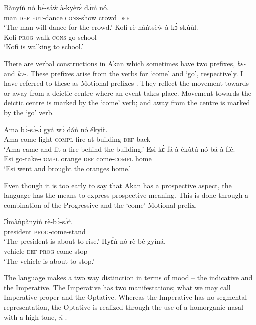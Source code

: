 \documentclass[output=paper]{langsci/langscibook}
\begin{document}
\ea\label{ex:8.osam}
\ea\label{ex:8a.osam}
\gll  Bànyíń  nó  bɛ́-sáẃ   à-kyèrɛ́    dɔ́ḿ  nó.\\
       man  \textsc{def}  \textsc{fut}-dance  \textsc{cons}-show  crowd  \textsc{def}\\
\glt   `The man will dance for the crowd.'
\ex\label{ex:8b.osam}
\gll    Kofi  rè-náńtsèẁ  à-kɔ̀    skúùl.\\
       Kofi  \textsc{prog}-walk  \textsc{cons}-go  school\\
\glt   `Kofi is walking to school.'
\z 
\z 


There are verbal constructions in Akan which sometimes have two prefixes, \textit{bɛ-} and \textit{kɔ-}. These prefixes arise from the verbs for `come' and `go', respectively. I have referred to these as Motional prefixes \citep{osam2002}. They reflect the movement towards or away from a deictic centre where an event takes place. Movement towards the deictic centre is marked by the `come' verb; and away from the centre is marked by the `go' verb. 

\ea\label{ex:9.osam}
\ea\label{ex:9a.osam}
\gll Ama  bɔ̀-sɔ́-ɔ̀      gyá  wɔ̀  dáń    nó  ékyì\`{r}.\\
       Ama  come-light-\textsc{compl}  fire  at  building  \textsc{def}  back\\
\glt   `Ama came and lit a fire behind the building.'
\ex\label{ex:9b.osam}
\gll  Esi  kɛ̀-fá-à      èkùtú    nó  bá-à    fíé.\\
       Esi  go-take-\textsc{compl}  orange    \textsc{def}  come-\textsc{compl}  home\\
\glt   `Esi went and brought the oranges home.'
\z 
\z 

Even though it is too early to say that Akan has a prospective aspect, the language has the means to express prospective meaning. This is done through a combination of the Progressive and the `come' Motional prefix.

\ea\label{ex:10.osam}
\ea\label{ex:10a.osam}
\gll   Ɔ̀màǹpànyíń  rè-bɔ́-sɔ́ŕ.\\
       president  \textsc{prog}-come-stand\\
\glt   `The president is about to rise.'
\ex\label{ex:10b.osam}
\gll    Hyɛ́ń    nó  rè-bé-gyíná.\\
       vehicle    \textsc{def}  \textsc{prog}-come-stop\\
\glt   `The vehicle is about to stop.'
\z 
\z 

The language makes a two way distinction in terms of mood -- the indicative and the Imperative. The Imperative has two manifestations; what we may call Imperative proper and the Optative. Whereas the Imperative has no segmental representation, the Optative is realized through the use of a homorganic nasal with a high tone, \textit{ń-}. 
\end{document}
